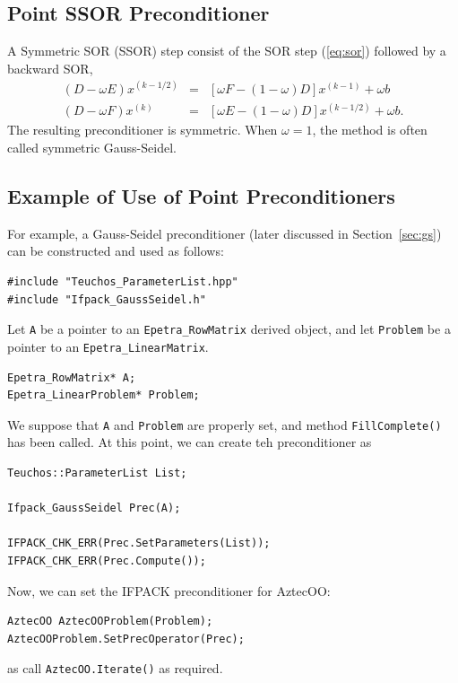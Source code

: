 \subsection{Point SSOR Preconditioner}
\label{sec:ssor}

A Symmetric SOR (SSOR) step consist of the SOR step (\ref{eq:sor}) followed by
a backward SOR,
\begin{equation}
\label{eq:ssor}
\begin{array}{rcl}
(D - \omega E) x^{(k-1/2)} &= &[ \omega F - (1 - \omega)D] x^{(k-1)} + \omega b \\
(D - \omega F) x^{(k)} &=& [ \omega E - (1 - \omega)D] x^{(k-1/2)} + \omega b .
\end{array}
\end{equation}
The resulting preconditioner is symmetric. When $\omega = 1$, the method
is often called symmetric Gauss-Seidel.

\subsection{Example of Use of Point Preconditioners}
\label{sec:point_ex}

For example, a Gauss-Seidel preconditioner (later discussed in
Section~\ref{sec:gs}) can be constructed and used as follows:
\begin{verbatim}
#include "Teuchos_ParameterList.hpp"
#include "Ifpack_GaussSeidel.h"
\end{verbatim}
Let \verb!A! be a pointer to an \verb!Epetra_RowMatrix! derived object,
  and let \verb!Problem! be a pointer to an \verb!Epetra_LinearMatrix!.
\begin{verbatim}
Epetra_RowMatrix* A;  
Epetra_LinearProblem* Problem;
\end{verbatim}
We suppose that \verb!A! and 
\verb!Problem! are properly set, and
method \verb~FillComplete()~ has been called. At this point, we can create teh
preconditioner as
\begin{verbatim}
Teuchos::ParameterList List;

Ifpack_GaussSeidel Prec(A);

IFPACK_CHK_ERR(Prec.SetParameters(List));
IFPACK_CHK_ERR(Prec.Compute());
\end{verbatim}
Now, we can set the IFPACK preconditioner for AztecOO:
\begin{verbatim}
AztecOO AztecOOProblem(Problem);
AztecOOProblem.SetPrecOperator(Prec);
\end{verbatim}
as call \verb!AztecOO.Iterate()! as required.

